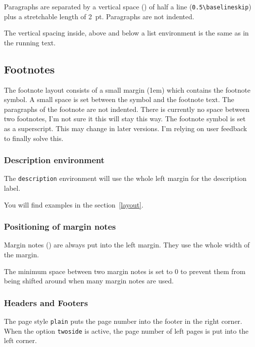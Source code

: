 Paragraphs are separated by a vertical space () of 
half a line (\verb|0.5\baselineskip|) plus a stretchable length of 2~pt.
Paragraphs are not indented.

The vertical spacing inside, above and below a list environment is the 
same as in the running text.

\subsection{Footnotes}

The footnote layout consists of a small margin (1em) which contains 
the footnote symbol. A small space is set between the symbol and the 
footnote text. The paragraphs of the footnote are not indented. There 
is currently no space between two footnotes, I'm not sure it this will 
stay this way. The footnote symbol is set as a superscript. This may 
change in later versions. I'm relying on user feedback to finally 
solve this.

\subsubsection{Description environment}

The \texttt{description} environment will use the whole left margin 
for the description label. 

You will find examples in the section~\ref{layout}.

\subsubsection{Positioning of margin notes}

Margin notes () are always put into the left margin. 
They use the whole width of the margin.

The minimum space between two margin notes is set to 0 to prevent 
them from being shifted around when many margin notes are used.

\subsubsection{Headers and Footers} \label{pagestyle}

The page style \texttt{plain} puts the page number into the footer in 
the right corner. When the option \texttt{twoside} is active, the page 
number of left pages is put into the left corner.

